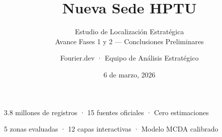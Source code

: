 \documentclass[aspectratio=169, 11pt]{beamer}
\title{Nueva Sede HPTU}
\subtitle{Estudio de Localización Estratégica\\[4pt]{\normalsize Avance Fases 1 y 2 — Conclusiones Preliminares}}
\author{Fourier.dev · Equipo de Análisis Estratégico}
\date{6 de marzo, 2026}
\begin{document}
{
\begin{frame}[plain]
\vfill
\begin{center}
{\inserttitle}

\vspace{10pt}
{\insertsubtitle}

\vspace{22pt}

\vspace{14pt}
{\small\textcolor{white!80}{
3.8 millones de registros · 15 fuentes oficiales · Cero estimaciones}}

\vspace{6pt}
{\small\textcolor{white!60}{
5 zonas evaluadas · 12 capas interactivas · Modelo MCDA calibrado}}

\vspace{22pt}
{\footnotesize\textcolor{white!50}{\insertauthor}}

\vspace{4pt}
{\footnotesize{}\insertdate}
\end{center}
\vfill
\end{frame}
}
\end{document}
